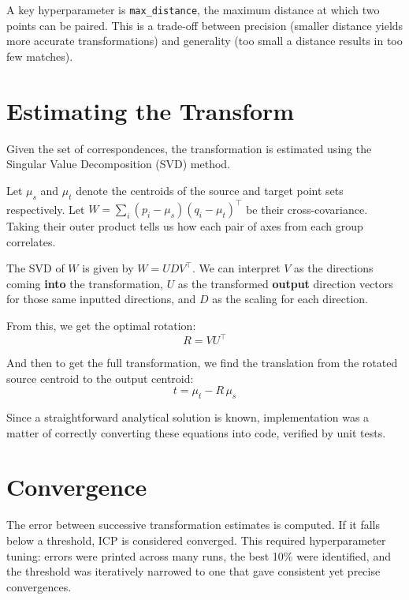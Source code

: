 \documentclass[12pt]{report}
\begin{document}
A key hyperparameter is \texttt{max\_distance}, the maximum distance at which two points can be
paired.
This is a trade-off between precision (smaller distance yields more accurate transformations) and
generality (too small a distance results in too few matches).


\section{Estimating the Transform}

Given the set of correspondences, the transformation is estimated using the Singular Value Decomposition (SVD) method.

Let $\mu_s$ and $\mu_t$ denote the centroids of the source and target point sets respectively. Let $W = \sum_i (p_i - \mu_s)(q_i - \mu_t)^\top$ be their cross-covariance. Taking their outer product tells us how each pair of axes from each group correlates. 

The SVD of $W$ is given by $W = U D V^\top$. We can interpret $V$ as the directions coming \textbf{into} the transformation, $U$ as the transformed \textbf{output} direction vectors for those same inputted directions, and $D$ as the scaling for each direction. 

From this, we get the optimal rotation:
\begin{equation}
    R = V U^\top
\end{equation}

And then to get the full transformation, we find the translation from the rotated source centroid to the output centroid:
\begin{equation}
    t = \mu_t - R\,\mu_s
\end{equation}

Since a straightforward analytical solution is known, implementation was a matter of correctly
converting these equations into code, verified by unit tests.

\section{Convergence}

The error between successive transformation estimates is computed.
If it falls below a threshold, ICP is considered converged.
This required hyperparameter tuning: errors were printed across many runs, the best 10\% were
identified, and the threshold was iteratively narrowed to one that gave consistent yet precise
convergences.
\end{document}
